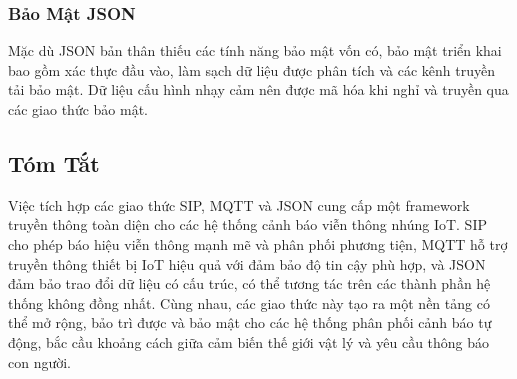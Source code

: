 \subsubsection{Bảo Mật JSON}
Mặc dù JSON bản thân thiếu các tính năng bảo mật vốn có, bảo mật triển khai bao gồm xác thực đầu vào, làm sạch dữ liệu được phân tích và các kênh truyền tải bảo mật. Dữ liệu cấu hình nhạy cảm nên được mã hóa khi nghỉ và truyền qua các giao thức bảo mật.

\subsection{Tóm Tắt}
\label{subsec:protocol_summary}

Việc tích hợp các giao thức SIP, MQTT và JSON cung cấp một framework truyền thông toàn diện cho các hệ thống cảnh báo viễn thông nhúng IoT. SIP cho phép báo hiệu viễn thông mạnh mẽ và phân phối phương tiện, MQTT hỗ trợ truyền thông thiết bị IoT hiệu quả với đảm bảo độ tin cậy phù hợp, và JSON đảm bảo trao đổi dữ liệu có cấu trúc, có thể tương tác trên các thành phần hệ thống không đồng nhất. Cùng nhau, các giao thức này tạo ra một nền tảng có thể mở rộng, bảo trì được và bảo mật cho các hệ thống phân phối cảnh báo tự động, bắc cầu khoảng cách giữa cảm biến thế giới vật lý và yêu cầu thông báo con người.
